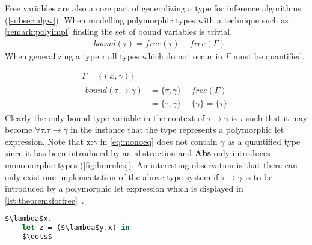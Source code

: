 \documentclass[11pt,oneside,a4paper]{report}
\begin{document}
Free variables are also a core part of generalizing a type for inference algorithms (\autoref{subsec:algw}).
When modelling polymorphic types with a technique such as \autoref{remark:polyimpl} finding the set of bound variables is trivial.
\begin{align}
    & \textit{bound}(\tau) = \textit{free}(\tau) - \textit{free}(\Gamma)
\end{align}
When generalizing a type $\tau$ all types which do not occur in $\Gamma$ must be quantified.
\begin{exmp}
\begin{gather}
    \Gamma = \{ (\textit{x}, \gamma) \} \label{eq:monoeq}\\
\begin{align}
    \textit{bound}(\tau \rightarrow \gamma) &= \{\tau , \gamma\} - \textit{free}(\Gamma)\\
    &= \{\tau , \gamma\} - \{ \gamma \} = \{ \tau \}\tag*{}
\end{align}
\end{gather}
Clearly the only bound type variable in the context of $\tau \rightarrow \gamma$ is $\tau$ such that it may become $\forall \tau. \tau \rightarrow \gamma$ in the instance that the type represents a polymorphic let expression.
    Note that $\texttt{x:}\gamma$ in \autoref{eq:monoeq} does not contain $\gamma$ as a quantified type since it has been introduced by an abstraction and \textbf{Abs} only introduces monomorphic types (\autoref{fig:hmrules}).
    An interesting observation is that there can only exist one implementation of the above type system if $\tau \rightarrow \gamma$ is to be introduced by a polymorphic let expression which is displayed in \autoref{lst:theoremsforfree}~\cite{wadler1989theorems}.
\begin{lstlisting}[language=ML,caption={Implementation of type state},label={lst:theoremsforfree},mathescape=true]
$\lambda$x.
    let z = ($\lambda$y.x) in
    $\dots$
\end{lstlisting}
\end{exmp}
\end{document}
